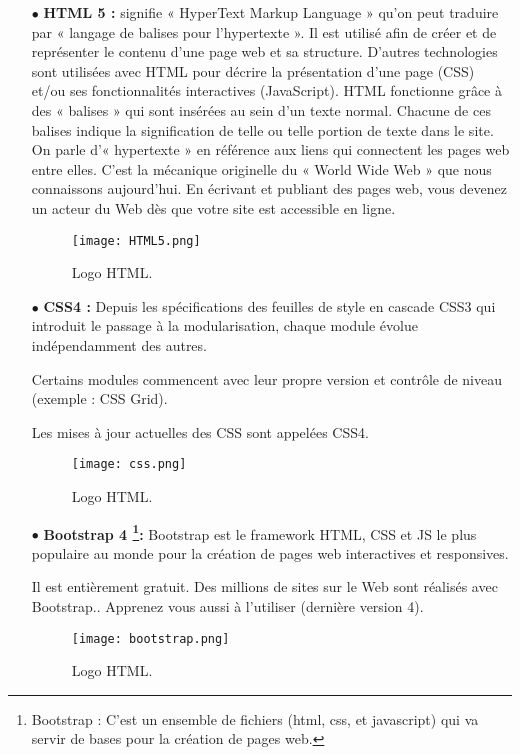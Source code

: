 \begin{itemize}
	\item[$\bullet$] \textbf{HTML 5 :} 	
 signifie « HyperText Markup Language » qu’on peut traduire par « langage de
balises pour l’hypertexte ». Il est utilisé afin de créer et de représenter le contenu d’une
page web et sa structure. D’autres technologies sont utilisées avec HTML pour décrire la
présentation d’une page (CSS) et/ou ses fonctionnalités interactives (JavaScript).
HTML fonctionne grâce à des « balises » qui sont insérées au sein d’un texte normal.
Chacune de ces balises indique la signification de telle ou telle portion de texte dans
le site. On parle d’« hypertexte » en référence aux liens qui connectent les pages web
entre elles. C’est la mécanique originelle du « World Wide Web » que nous connaissons
aujourd’hui. En écrivant et publiant des pages web, vous devenez un acteur du Web dès
que votre site est accessible en ligne.\cite{wiki:Hypertext_Markup_Language}
	\begin{figure}[ht]
		\centering
		\texttt{[image: HTML5.png]}
		\caption{Logo HTML.}
		\label{fig:HTML5 }
	\end{figure}
	\FloatBarrier	
	\medskip
	

		\item[$\bullet$] \textbf{CSS4 :} 
Depuis les spécifications des feuilles de style en cascade CSS3 qui introduit le passage à la modularisation, chaque module évolue indépendamment des autres.

Certains modules commencent avec leur propre version et contrôle de niveau (exemple : CSS Grid).

Les mises à jour actuelles des CSS sont appelées CSS4.\cite{wiki:Feuilles_de_style_en_cascade}
		\begin{figure}[ht]
			\centering
			\texttt{[image: css.png]}
			\caption{Logo HTML.}
			\label{fig:HTML5 }
		\end{figure}
		\FloatBarrier
		
		\medskip
		
		
	\item[$\bullet$] \textbf{Bootstrap 4 \footnote{Bootstrap : C’est un ensemble de fichiers (html, css, et javascript) qui va servir de bases pour la création de pages web.}:} 
Bootstrap est le framework HTML, CSS et JS le plus populaire au monde pour la création de pages web interactives et responsives.

Il est entièrement gratuit. Des millions de sites sur le Web sont réalisés avec Bootstrap.. Apprenez vous aussi à l’utiliser (dernière version 4).\cite{wiki:Bootstrap_(front-end_framework)}
\begin{figure}[ht]
	\centering
	\texttt{[image: bootstrap.png]}
	\caption{Logo HTML.}
	\label{fig:HTML5 }
\end{figure}
\FloatBarrier


\end{itemize}
